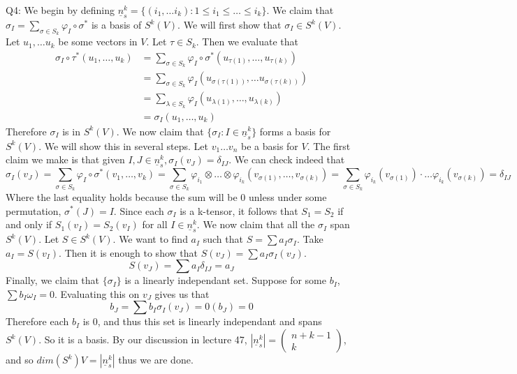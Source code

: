 \documentclass[letterpaper]{article}
\begin{document}
\noindent Q4: We begin by defining $\underline{n}_s^k = \{ (i_1, \dots i_k): 1\leq i_1 \leq \dots \leq i_k \}$. We claim that $\sigma_I = \sum_{\sigma\in S_k}\varphi_{I}\circ \sigma^*$ is a basis of $S^k(V)$. We will first show that $\sigma_I\in S^k(V)$. Let $u_1,\dots u_k$ be some vectors in $V$. Let $\tau\in S_k$. Then we evaluate that 
\begin{align*}
    \sigma_I \circ \tau^{*}(u_1, \dots , u_k) & = \sum_{\sigma\in S_k} \varphi_I \circ \sigma^{*} ( u_{\tau(1)},  \dots, u_{\tau(k)})
    \\ & = \sum_{\sigma \in S_k} \varphi_I (u_{\sigma(\tau(1))} , \dots u_{\sigma(\tau(k))})
    \\ & = \sum_{\lambda \in S_k} \varphi_I ( u_{\lambda(1)}, \dots , u_{\lambda(k)}) \tag{since for fixed $\tau$, $\sigma\circ\tau$ is $S_k$ for $\sigma\in S_k$}
    \\ & = \sigma_{I}(u_1 , \dots , u_k)
\end{align*} Therefore $\sigma_I$ is in $S^k(V)$. We now claim that $\{\sigma_I: I\in \underline{n}_s^k \}$ forms a basis for $S^k(V)$. We will show this in several steps. Let $v_1\dots v_n$ be a basis for $V$. The first claim we make is that given $I,J\in \underline{n}_s^k,\sigma_I(v_J) = \delta_{IJ}$. We can check indeed that 
$$\sigma_I(v_J) = \sum_{\sigma \in S_k}\varphi_I \circ \sigma^* (v_1 , \dots, v_k)  = \sum_{\sigma \in S_k} \varphi_{i_1}\otimes \dots \otimes \varphi_{i_k}(v_{\sigma(1)}, \dots, v_{\sigma(k)}) = \sum_{\sigma \in S_k} \varphi_{i_k}(v_{\sigma(1)})\cdot \dots \varphi_{i_k}(v_{\sigma(k)}) = \delta_{IJ}$$
Where the last equality holds because the sum will be 0 unless under some permutation, $\sigma^{*}(J)=I$. Since each $\sigma_I$ is a k-tensor, it follows that $S_1=S_2$ if and only if $S_1(v_I)=S_2(v_I)$ for all $I\in \underline{n}_s^k$. We now claim that all the $\sigma_I$ span $S^k(V)$. Let $S\in S^k(V)$. We want to find $a_I$ such that $S=\sum a_I \sigma_I$. Take $a_I=S(v_I)$. Then it is enough to show that $S(v_J)=\sum a_I \sigma_I(v_J)$. $$S(v_J) =\sum a_I \delta_{IJ} = a_J$$
Finally, we claim that $\{\sigma_I \}$ is a linearly independant set. Suppose for some $b_I$, $\sum b_I \omega_I = 0$. Evaluating this on $v_J$ gives us that $$b_J = \sum b_I \sigma_I (v_J) = 0(b_J) = 0$$ Therefore each $b_I$ is 0, and thus this set is linearly independant and spans $S^k(V)$. So it is a basis. By our discussion in lecture 47, $|\underline{n}_s^k| = \begin{pmatrix}
    n+k-1 \\ k
\end{pmatrix}$, and so $dim(S^k)V = | \underline{n}_s^k |$ thus we are done. 
\end{document}
